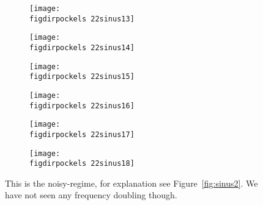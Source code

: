 \begin{figure}
    \begin{subfigure}[b]{\picwidth}
        \texttt{[image: \\figdirpockels 22sinus13]}
        \caption{}
    \end{subfigure}\qquad
    \begin{subfigure}[b]{\picwidth}
        \texttt{[image: \\figdirpockels 22sinus14]}
        \caption{}
    \end{subfigure}
    \begin{subfigure}[b]{\picwidth}
        \texttt{[image: \\figdirpockels 22sinus15]}
        \caption{}
    \end{subfigure}
    \begin{subfigure}[b]{\picwidth}
        \texttt{[image: \\figdirpockels 22sinus16]}
        \caption{}
    \end{subfigure}
    \begin{subfigure}[b]{\picwidth}
        \texttt{[image: \\figdirpockels 22sinus17]}
        \caption{}
    \end{subfigure}
    \begin{subfigure}[b]{\picwidth}
        \texttt{[image: \\figdirpockels 22sinus18]}
        \caption{}
    \end{subfigure}

    \caption{This is the noisy-regime, for explanation see
        Figure~\ref{fig:sinus2}. We have not seen any frequency
        doubling though.}
    \label{fig:sinus3}
\end{figure}

